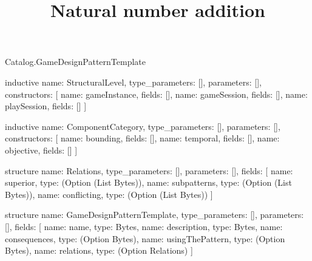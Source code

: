 \begin{lexlean}{Catalog.GameDesignPatternTemplate}
\title{Natural number addition}
\begin{semanticmodule}
inductive{
  name: StructuralLevel,
  type_parameters: [],
  parameters: [],
  constructors: [
    {name: gameInstance, fields: []},
    {name: gameSession, fields: []},
    {name: playSession, fields: []}
  ]
}

inductive{
  name: ComponentCategory,
  type_parameters: [],
  parameters: [],
  constructors: [
    {name: bounding, fields: []},
    {name: temporal, fields: []},
    {name: objective, fields: []}
  ]
}

structure{
  name: Relations,
  type_parameters: [],
  parameters: [],
  fields: [
    {name: superior, type: (Option (List Bytes))},
    {name: subpatterns, type: (Option (List Bytes))},
    {name: conflicting, type: (Option (List Bytes))}
  ]
}

structure{
  name: GameDesignPatternTemplate,
  type_parameters: [],
  parameters: [],
  fields: [
    {name: name, type: Bytes},
    {name: description, type: Bytes},
    {name: consequences, type: (Option Bytes)},
    {name: usingThePattern, type: (Option Bytes)},
    {name: relations, type: (Option Relations)}
  ]
}
\end{semanticmodule}
\end{lexlean}
